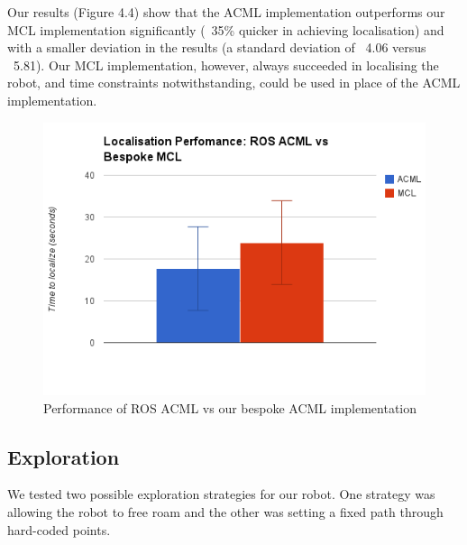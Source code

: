 \documentclass{article}
\begin{document}
Our results (Figure 4.4) show that the ACML implementation outperforms our MCL implementation significantly (~35\% quicker in achieving localisation) and with a smaller deviation in the results (a standard deviation of ~4.06 versus ~5.81). Our MCL implementation, however, always succeeded in localising the robot, and time constraints notwithstanding, could be used in place of the ACML implementation.
	\begin{figure}[H]
	\begin{center}
	\includegraphics[width=0.9\linewidth]{ExperimentalResults8}
	\caption{Performance of ROS ACML vs our bespoke ACML implementation}
	\end{center}
	\end{figure}
	
	
	
	
	
	\subsection{Exploration}
	We tested two possible exploration strategies for our robot. One strategy was allowing the robot to free roam and the other was setting a fixed path through hard-coded points.
	
\end{document}
